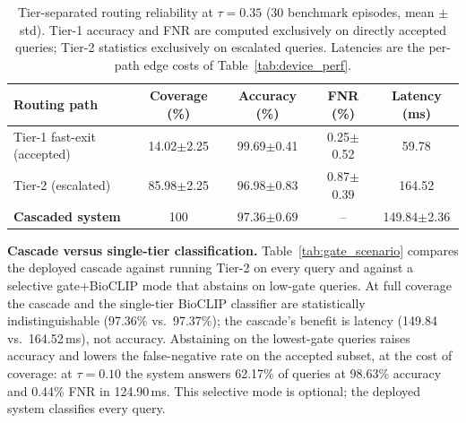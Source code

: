 \documentclass[preprint,12pt]{elsarticle}
\begin{document}
\begin{table}[htbp]
\centering
\caption{Tier-separated routing reliability at $\tau=0.35$ (30 benchmark episodes, mean $\pm$ std). Tier-1 accuracy and FNR are computed exclusively on directly accepted queries; Tier-2 statistics exclusively on escalated queries. Latencies are the per-path edge costs of Table~\ref{tab:device_perf}.}
\label{tab:tier_routing}
\small
\begin{tabularx}{\textwidth}{lcccc}
\toprule
\textbf{Routing path} & \textbf{Coverage (\%)} & \textbf{Accuracy (\%)} & \textbf{FNR (\%)} & \textbf{Latency (ms)} \\
\midrule
Tier-1 fast-exit (accepted) & 14.02$\pm$2.25 & 99.69$\pm$0.41 & 0.25$\pm$0.52 & 59.78 \\
Tier-2 (escalated) & 85.98$\pm$2.25 & 96.98$\pm$0.83 & 0.87$\pm$0.39 & 164.52 \\
\midrule
\textbf{Cascaded system} & 100 & 97.36$\pm$0.69 & -- & 149.84$\pm$2.36 \\
\bottomrule
\end{tabularx}
\end{table}

\textbf{Cascade versus single-tier classification.} Table~\ref{tab:gate_scenario} compares the deployed cascade against running Tier-2 on every query and against a selective gate+BioCLIP mode that abstains on low-gate queries. At full coverage the cascade and the single-tier BioCLIP classifier are statistically indistinguishable (97.36\% vs.\ 97.37\%); the cascade's benefit is latency (149.84 vs.\ 164.52\,ms), not accuracy. Abstaining on the lowest-gate queries raises accuracy and lowers the false-negative rate on the accepted subset, at the cost of coverage: at $\tau=0.10$ the system answers 62.17\% of queries at 98.63\% accuracy and 0.44\% FNR in 124.90\,ms. This selective mode is optional; the deployed system classifies every query.
\end{document}
